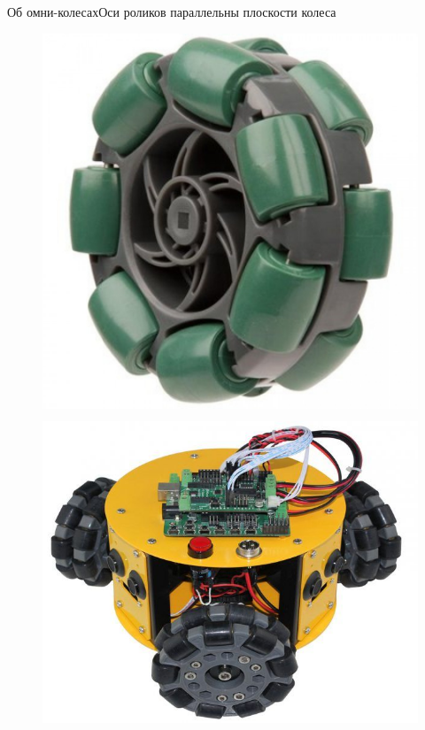 \documentclass{beamer}
\begin{document}
\begin{frame}{Об омни-колесах}{Оси роликов параллельны плоскости колеса}
\begin{figure}[H]
\begin{columns}
                \centering
                \includegraphics[width=\linewidth]{content/pic/photo/wheel_two_rows.jpg}
        \end{columns}
    \end{figure}
    \vspace{-10pt}
    \begin{figure}[H]
        \centering
        \begin{columns}
                \centering
                \includegraphics[width=\linewidth]{content/pic/photo/vehicle_three_two_row.jpg}

\end{columns}
\end{figure}
\end{frame}
\end{document}
